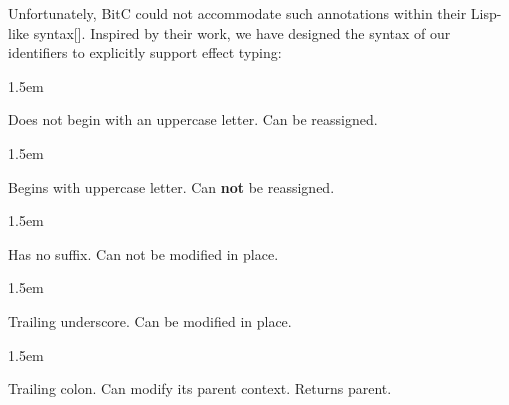\documentclass[preprint]{{acmart}}
\begin{document}
 Unfortunately, BitC could not accommodate such annotations within their
 Lisp-like syntax[]. Inspired by their work, we have designed the
 syntax of our identifiers to explicitly support effect typing:%

\begin{mddefinitions}%


\begin{mdbmarginx}{}{}{}{1.5em}%
\begin{mddefdata}%
Does not begin with an uppercase letter. Can be reassigned. 
\end{mddefdata}%
\end{mdbmarginx}%


\begin{mdbmarginx}{}{}{}{1.5em}%
\begin{mddefdata}%
Begins with uppercase letter. Can \textbf{not} be reassigned. 
\end{mddefdata}%
\end{mdbmarginx}%


\begin{mdbmarginx}{}{}{}{1.5em}%
\begin{mddefdata}%
Has no suffix. Can not be modified in place.
\end{mddefdata}%
\end{mdbmarginx}%


\begin{mdbmarginx}{}{}{}{1.5em}%
\begin{mddefdata}%
Trailing underscore. Can be modified in place.
\end{mddefdata}%
\end{mdbmarginx}%


\begin{mdbmarginx}{}{}{}{1.5em}%
\begin{mddefdata}%
Trailing colon. Can modify its parent context. Returns parent.%
\end{mddefdata}%
\end{mdbmarginx}%
\end{mddefinitions}%
\end{document}
